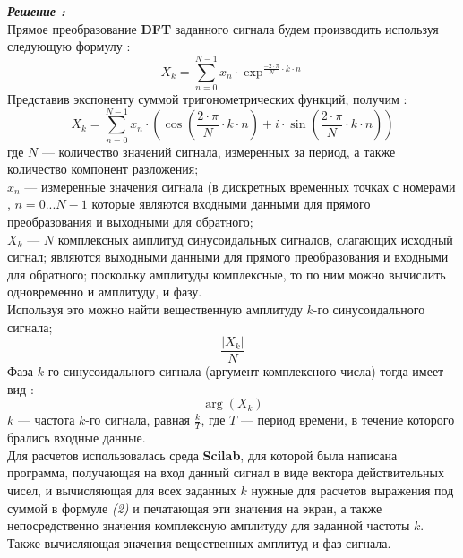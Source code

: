 \documentclass[a4paper,11pt]{article}
\begin{document}
		\begin{flushleft}
		\textit{\textbf{Решение :}}
		\\
		\medskip
		\hangindent=1.5cm  \noindent
		Прямое преобразование \textbf{DFT} заданного сигнала будем производить используя следующую формулу :
		\begin{equation}
			X_k = \sum_{n=0}^{N-1} x_n \cdot \exp^{\frac{-2 \cdot \pi }{N} \cdot k \cdot n}
		\end{equation}
		Представив экспоненту суммой тригонометрических функций, получим :
		\begin{equation}
			X_k = \sum_{n=0}^{N-1} x_n \cdot (\cos({\frac{2 \cdot \pi }{N} \cdot k \cdot n}) + i \cdot \sin({\frac{2 \cdot \pi }{N} \cdot k \cdot n}))			
		\end{equation}
		где ${N}$ — количество значений сигнала, измеренных за период, а также количество компонент разложения;
		\\
		${x_n}$ — измеренные значения сигнала (в дискретных временных точках с номерами , ${n = 0...N-1}$ которые являются входными данными для прямого преобразования и выходными для обратного;
		\\
		${X_k}$ — $N$ комплексных амплитуд синусоидальных сигналов, слагающих исходный сигнал; являются выходными данными для прямого преобразования и входными для обратного; поскольку амплитуды комплексные, то по ним можно вычислить одновременно и амплитуду, и фазу.
		\\
		\medskip
		Используя это можно найти вещественную амплитуду $k$-го синусоидального сигнала;
		\begin{equation}
			\frac{|X_k|}{N}
		\end{equation}
		Фаза $k$-го синусоидального сигнала (аргумент комплексного числа) тогда имеет вид :
		\begin{equation}
			\arg(X_k)
		\end{equation}
		$k$ — частота $k$-го сигнала, равная ${\frac{k}{T}}$, где $T$ — период времени, в течение которого брались входные данные.
		\\		
		\bigskip
		Для расчетов использовалась среда \textbf{Scilab}, для которой была написана программа, получающая на вход данный сигнал в виде вектора действительных чисел, и вычисляющая для всех заданных $k$ нужные для расчетов выражения под суммой в формуле \textit{(2)} и печатающая эти значения на экран, а также непосредственно значения комплексную амплитуду для заданной частоты $k$.\\
		Также вычисляющая значения вещественных амплитуд и фаз сигнала.
		\end{flushleft}
\end{document}
